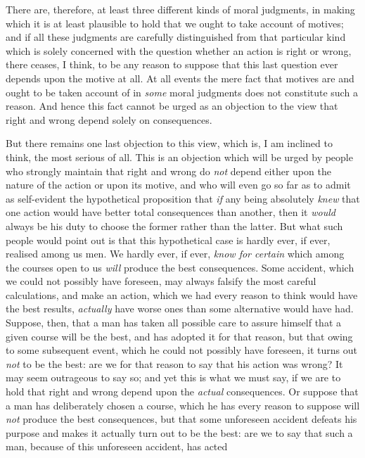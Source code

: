 There are, therefore, at least three different kinds of moral
judgments, in making which it is at least plausible to hold that we
ought to take account of motives; and if all these judgments are
carefully distinguished from that particular kind which is solely
concerned with the question whether an action is right  or
wrong, there ceases, I think, to be any reason to suppose that this
last question ever depends upon the motive at all. At all events the
mere fact that motives are and ought to be taken account of in
\textit{some} moral judgments does not constitute such a reason. And
hence this fact cannot be urged as an objection to the view that right
and wrong depend solely on consequences.

But there remains one last objection to this view, which is, I am
inclined to think, the most serious of all. This is an objection which
will be urged by people who strongly maintain that right and wrong do
\textit{not} depend either upon the nature of the action or upon its
motive, and who will even go so far as to admit as self-evident the
hypothetical proposition that \textit{if} any being absolutely
\textit{knew} that one action would have better total consequences
than another, then it \textit{would} always be his duty to choose the
former rather than the latter. But what such people would point out is
that this hypothetical case is hardly ever, if ever, realised among us
men. We hardly ever, if ever, \textit{know for certain} which among
the  courses open to us \textit{will} produce the best
consequences. Some accident, which we could not possibly have
foreseen, may always falsify the most careful calculations, and make
an action, which we had every reason to think would have the best
results, \textit{actually} have worse ones than some alternative would
have had. Suppose, then, that a man has taken all possible care to
assure himself that a given course will be the best, and has adopted
it for that reason, but that owing to some subsequent event, which he
could not possibly have foreseen, it turns out \textit{not} to be the
best: are we for that reason to say that his action was wrong? It may
seem outrageous to say so; and yet this is what we must say, if we are
to hold that right and wrong depend upon the \textit{actual}
consequences. Or suppose that a man has deliberately chosen a course,
which he has every reason to suppose will \textit{not} produce the
best consequences, but that some unforeseen accident defeats his
purpose and makes it actually turn out to be the best: are we to say
that such a man, because of this unforeseen accident, has acted
